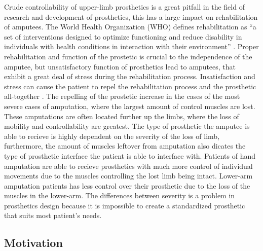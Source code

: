 \documentclass[../main.tex]{subfiles}
\begin{document}
Crude controllability of upper-limb prosthetics is a great pitfall in the field of research and development of prosthetics, this has a large impact on rehabilitation of amputees.
The World Health Organization (WHO) defines rehabilitation as ``a set of interventions designed to optimize functioning and reduce disability in individuals with health conditions in interaction with their environment'' \cite{WHO_rehab}.
Proper rehabilitation and function of the prostetic is crucial to the independence of the amputee, but unsatisfactory function of prosthetics lead to amputees, that exhibit a great deal of stress during the rehabilitation process.
Insatisfaction and stress can cause the patient to repel the rehabilitation process and the prosthetic all-together \cite{Kristin2012}.
The repelling of the prostetic increase in the cases of the most severe cases of amputation, where the largest amount of control muscles are lost.
These amputations are often located further up the limbs, where the loss of mobility and controllability are greatest.
The type of prosthetic the amputee is able to recieve is highly dependent on the severity of the loss of limb, furthermore, the amount of muscles leftover from amputation also dicates the type of prosthetic interface the patient is able to interface with.
Patients of hand amputation are able to recieve prosthetics with much more control of individual movements due to the muscles controlling the lost limb being intact. 
Lower-arm amputation patients has less control over their prosthetic due to the loss of the muscles in the lower-arm.
The differences between severity is a problem in prosthetics design because it is impossible to create a standardized prosthetic that suits most patient's needs.


\subsection{Motivation}
\end{document}
